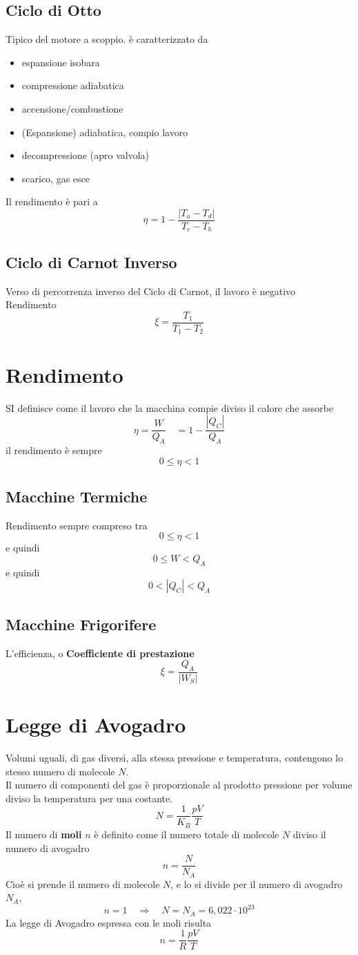\documentclass[a4paper]{report}
\begin{document}
  \subsection{Ciclo di Otto}
  Tipico del motore a scoppio. è caratterizzato da
  \begin{itemize}
    \item espansione isobara
    \item compressione adiabatica
    \item accensione/combustione
    \item (Espansione) adiabatica, compio lavoro
    \item decompressione (apro valvola)
    \item scarico, gas esce
  \end{itemize}
  Il rendimento è pari a
  $$ \eta = 1 - \frac{|T_a - T_d|}{T_c - T_b} $$

  \subsection{Ciclo di Carnot Inverso}
  Verso di percorrenza inverso del Ciclo di Carnot, il lavoro è negativo \\
  Rendimento
  $$ \xi = \frac{T_1}{T_1 - T_2} $$

  \section{Rendimento}
  SI definisce come il lavoro che la macchina compie diviso il calore che assorbe
  $$ \eta=\frac{W}{Q_A} \quad = 1- \frac{|Q_C|}{Q_A}$$
  il rendimento è sempre
  $$ 0 \leq \eta < 1$$
  \subsection{Macchine Termiche}
  Rendimento sempre compreso tra
  $$0 \leq \eta < 1$$
  e quindi
  $$0 \leq W < Q_A $$
  e quindi
  $$ 0 < |Q_C| < Q_A $$
  \subsection{Macchine Frigorifere}
  L'efficienza, o \textbf{Coefficiente di prestazione}
  $$ \xi = \frac{Q_A}{|W_S|}  $$


  \section{Legge di Avogadro}
  Volumi uguali, di gas diversi, alla stessa pressione e temperatura, contengono lo stesso numero di molecole $N$. \\Il numero di componenti del gas è proporzionale al prodotto pressione per volume diviso la temperatura per una costante.
  $$ N = \frac{1}{K_B} \frac{pV}{T} $$
  Il numero di \textbf{moli} $n$ è definito come il numero totale di molecole $N$ diviso il numero di avogadro
  $$ n = \frac{N}{N_A} $$
  Cioè si prende il numero di molecole $N$, e lo si divide per il numero di avogadro $N_A$,
  $$ n = 1 \quad \Rightarrow \quad N = N_A = 6,022 \cdot 10^{23}$$
  La legge di Avogadro espressa con le moli risulta
  $$ n = \frac{1}{R} \frac{pV}{T} $$
\end{document}

